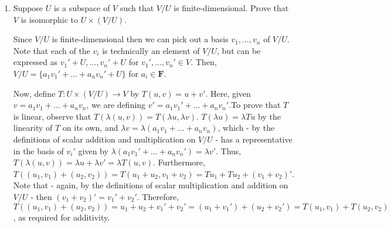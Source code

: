 \documentclass{book}
\begin{document}
\begin{enumerate}
(b) Select any affine subset \(A'\) of \(V\) containing \(v_1,\dots,v_m\).  Consider the subset \(U' = A' - v_1\); clearly it contains the vector \(0\), and so by 3.85 is the base subspace of \(A'\).  To prove that \(U'\) contains the original \(U\), and therefore that (using the result from (a)) \(A = v_1 + U \subseteq A' = v_1 + U'\), we will prove that any subspace containing \(0, v_2-v_1,\dots,v_n-v_1\) contains \(U\).  Pick arbitrary \(u = \lambda_1v_1 + \dots + \lambda_mv_m \in U\), so that - rearranging the equality used to define \(U\) - then \(\lambda_1 = -(\lambda_2 + \dots + \lambda_n)\). 
 Consider the vector \(u' = \lambda_2(v_2 - v_1) + \dots + \lambda_m(v_m - v_1)\); it can be rewritten as \(-(\lambda_2 + \dots + \lambda_m)v_1 + \lambda_2v_2 + \dots + \lambda_mv_m\).  The condition on the coefficient of \(v_1\) is exactly the same as that on \(\lambda_1\) in the definition of \(u\), and so then the two vectors are equal, completing the proof.

(c) Part (b) establishes that the list \(v_2-v_1,\dots,v_m-v_1\) is a spanning list of \(U\).  It has length \(m-1\), so then by 2.31 \(\text{dim} \, U \leq m-1\).

\item Suppose \(U\) is a subspace of \(V\) such that \(V/U\) is finite-dimensional.  Prove that \(V\) is isomorphic to \(U \times (V/U)\).

Since \(V/U\) is finite-dimensional then we can pick out a basis \(v_1,\dots,v_n\) of \(V/U\).  Note that each of the \(v_i\) is technically an element of \(V/U\), but can be expressed as \(v_1'+U,\dots,v_n'+U\) for \(v_1',\dots,v_n' \in V\).  Then, \(V/U = \{a_1v_1'+\dots+a_nv_n'+U\}\) for \(a_i \in \textbf{F}\).

Now, define \(T: U \times (V/U) \rightarrow V\) by \(T(u, v) = u+v'\).  Here, given \(v=a_1v_1+\dots+a_nv_n\), we are defining \(v'=a_1v_1'+\dots+a_nv_n'\).To prove that \(T\) is linear, observe that \(T(\lambda(u,v)) = T(\lambda u, \lambda v)\).  \(T(\lambda u) = \lambda Tu\) by the linearity of \(T\) on its own, and \(\lambda v = \lambda (a_1v_1+\dots+a_nv_n)\), which - by the definitions of scalar addition and multiplication on \(V/U\) - has a representative in the basis of \(v_i'\) given by \(\lambda(a_1v_1'+\dots+a_nv_n')=\lambda v'\).  Thus, \(T(\lambda(u,v)) = \lambda u + \lambda v' = \lambda T(u,v)\).  Furthermore, \(T((u_1,v_1)+(u_2,v_2)) = T(u_1+u_2,v_1+v_2) = Tu_1+Tu_2+(v_1+v_2)'\).  Note that - again, by the definitions of scalar multiplication and addition on \(V/U\) - then \((v_1+v_2)'=v_1'+v_2'\).  Therefore, \(T((u_1,v_1)+(u_2,v_2))=u_1+u_2+v_1'+v_2'=(u_1+v_1')+(u_2+v_2')=T(u_1,v_1)+T(u_2,v_2)\), as required for additivity.


\end{enumerate}
\end{document}
